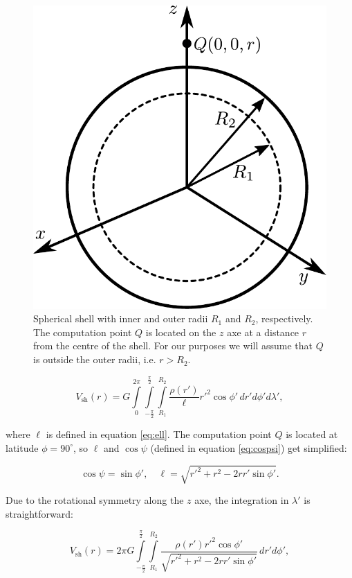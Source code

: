 \documentclass[extra]{gji}
\begin{document}
\begin{figure}
\centering
\includegraphics[width=0.7\linewidth]{figures/spherical-shell.pdf}
\caption{
Spherical shell with inner and outer radii $R_1$ and $R_2$, respectively.
The computation point $Q$ is located on the $z$ axe at a distance $r$ from the centre of the shell.
For our purposes we will assume that $Q$ is outside the outer radii, i.e. $r > R_2$.
}
\label{fig:spherical-shell}
\end{figure}

\begin{equation}
    V_\text{sh}(r) = G 
    \int\limits_0^{2\pi}
    \int\limits_{-\frac{\pi}{2}}^\frac{\pi}{2}
    \int\limits_{R_1}^{R_2}
    \frac{\rho(r')}{\ell} {r'}^2 \cos\phi' \, 
    dr' d\phi' d\lambda',
\end{equation}

\noindent where $\ell$ is defined in equation \ref{eq:ell}.
The computation point $Q$ is located at latitude $\phi=90^\circ$, so $\ell$ and $\cos\psi$ (defined in equation \ref{eq:cospsi}) get simplified:

\begin{equation}
    \cos\psi = \sin\phi', \quad
    \ell = \sqrt{r'^2 + r^2 - 2 r r' \sin\phi'}.
\end{equation}

Due to the rotational symmetry along the $z$ axe, the integration in $\lambda'$ is straightforward:

\begin{equation}
    V_\text{sh}(r) = 2\pi G 
    \int\limits_{-\frac{\pi}{2}}^\frac{\pi}{2}
    \int\limits_{R_1}^{R_2}
    \frac{\rho(r') {r'}^2 \cos\phi'}{\sqrt{r'^2 + r^2 - 2 r r' \sin\phi'}}
    \, dr' d\phi',
\end{equation}
\end{document}
